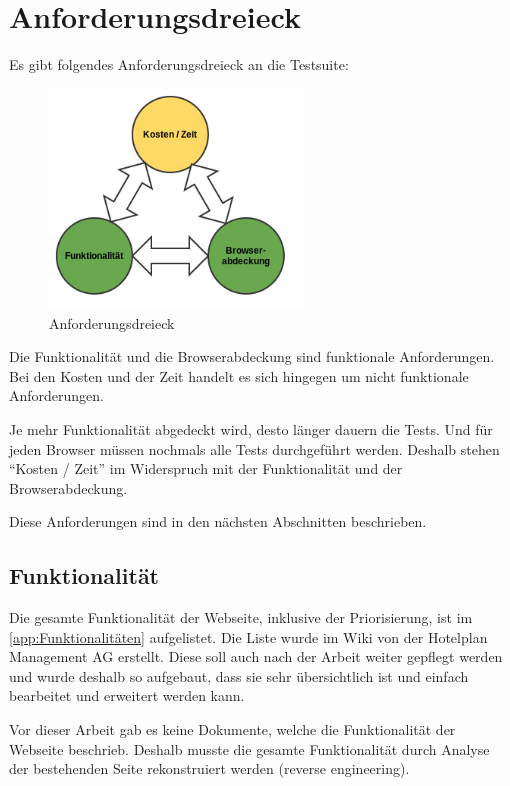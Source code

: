 \section{Anforderungsdreieck}
Es gibt folgendes Anforderungsdreieck an die Testsuite:
\begin{figure}[H]
	\centering
	\includegraphics[width=0.6\textwidth]{images/triangle.png}
	\caption{Anforderungsdreieck}
	\label{fig:analyse:Anforderungsdreieck}
\end{figure}
Die Funktionalität und die Browserabdeckung sind funktionale Anforderungen. Bei den Kosten und der Zeit handelt es sich hingegen um nicht funktionale Anforderungen.

Je mehr Funktionalität abgedeckt wird, desto länger dauern die Tests. Und für jeden Browser müssen nochmals alle Tests durchgeführt werden. Deshalb stehen "`Kosten / Zeit"' im Widerspruch mit der Funktionalität und der Browserabdeckung.

Diese Anforderungen sind in den nächsten Abschnitten beschrieben.

\subsection{Funktionalität}
\label{sec:analyse:Funktionalität}
Die gesamte Funktionalität der Webseite, inklusive der Priorisierung, ist im \cref{app:Funktionalitäten}  aufgelistet. Die Liste wurde im Wiki von der Hotelplan Management AG erstellt. Diese soll auch nach der Arbeit weiter gepflegt werden und wurde deshalb so aufgebaut, dass sie sehr übersichtlich ist und einfach bearbeitet und erweitert werden kann.

Vor dieser Arbeit gab es keine Dokumente, welche die Funktionalität der Webseite beschrieb. Deshalb musste die gesamte Funktionalität durch Analyse der bestehenden Seite rekonstruiert werden (reverse engineering).


